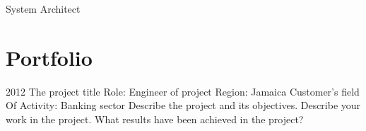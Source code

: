 \documentclass[print]{friggeri-cv} %
\begin{document}
 

       {System Architect} %
~ \\

 




\section{Portfolio}
 
\begin{entrylist}

\entry
{2012}
{The project title}
{Role: }{Engineer of project}
{Region: }{Jamaica}
{Customer's field Of Activity: }{Banking sector}
{
Describe the project and its objectives. Describe your work in the project. What results have been achieved in the project?
}

\end{entrylist}
\end{document}
